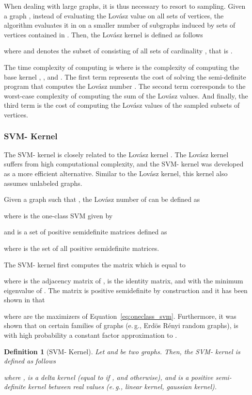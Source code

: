 \documentclass[twoside,11pt]{article}
\newcommand{\eg}{e.\,g., }
\newtheorem{definition}{Definition}
\begin{document}
When dealing with large graphs, it is thus necessary to resort to sampling.
Given a graph , instead of evaluating the Lov\'asz value on all  sets of vertices, the algorithm evaluates it in on a smaller number of subgraphs induced by sets of vertices contained in .
Then, the Lov\'asz  kernel is defined as follows

where  and  denotes the subset of  consisting of all sets of cardinality , that is .

The time complexity of computing  is  where  is the complexity of computing the base kernel , ,  and .
The first term represents the cost of solving the semi-definite program that computes the Lov\'asz number .
The second term corresponds to the worst-case complexity of computing the sum of the Lov\'asz values.
And finally, the third term is the cost of computing the Lov\'asz values of the sampled subsets of vertices.


\subsubsection{SVM- Kernel}
The SVM- kernel is closely related to the Lov\'asz  kernel .
The Lov\'asz  kernel suffers from high computational complexity, and the SVM- kernel was developed as a more efficient alternative. 
Similar to the Lov\'asz  kernel, this kernel also assumes unlabeled graphs.

Given a graph  such that , the Lov\'asz number of  can be defined as

where  is the one-class SVM given by

and  is a set of positive semidefinite matrices defined as

where  is the set of all  positive semidefinite matrices.

The SVM- kernel first computes the matrix  which is equal to

where  is the adjacency matrix of ,  is the  identity matrix, and  with  the minimum eigenvalue of .
The matrix  is positive semidefinite by construction and it has been shown in  that

where  are the maximizers of Equation~\eqref{eq:oneclass_svm}. 
Furthermore, it was shown that on certain families of graphs (\eg Erd{\"o}s R{\'e}nyi random graphs),  is with high probability a constant factor approximation to .

\begin{definition}[SVM- Kernel]
	Let  and  be two graphs.
	Then, the SVM- kernel is defined as follows
	
	where ,  is a delta kernel (equal to  if , and  otherwise), and  is a positive semi-definite kernel between real values (\eg linear kernel, gaussian kernel).
\end{definition}
\end{document}
